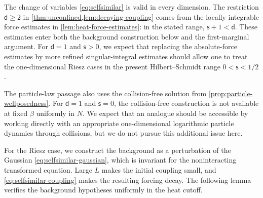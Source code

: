 \documentclass[11pt,reqno]{amsart}
\numberwithin{equation}{section}
\theoremstyle{plain}
\theoremstyle{remark}
\renewcommand{\d}{\mathsf{d}}\newcommand{\s}{\mathsf{s}}
\begin{document}
\begin{remark}\label{rem:selfsimilar-one-dimensional}
The change of variables \eqref{eq:selfsimilar} is valid in every dimension. The restriction $\d\ge2$ in \cref{thm:unconfined,lem:decaying-coupling} comes from the locally integrable force estimates in \cref{lem:heat-force-estimates}: in the stated range, $\s+1<\d$. These estimates enter both the background construction below and the first-marginal argument. For $\d=1$ and $\s>0$, we expect that replacing the absolute-force estimates by more refined singular-integral estimates should allow one to treat the one-dimensional Riesz cases in the present Hilbert--Schmidt range $0<\s<1/2$.

The particle-law passage also uses the collision-free solution from \cref{prop:particle-wellposedness}. For $\d=1$ and $\s=0$, the collision-free construction is not available at fixed $\beta$ uniformly in $N$. We expect that an analogue should be accessible by working directly with an appropriate one-dimensional logarithmic particle dynamics through collisions, but we do not pursue this additional issue here.
\end{remark}

For the Riesz case, we construct the background as a perturbation of the Gaussian \eqref{eq:selfsimilar-gaussian}, which is invariant for the noninteracting transformed equation. Large $L$ makes the initial coupling small, and \eqref{eq:selfsimilar-coupling} makes the resulting forcing decay. The following lemma verifies the background hypotheses uniformly in the heat cutoff.
\end{document}
